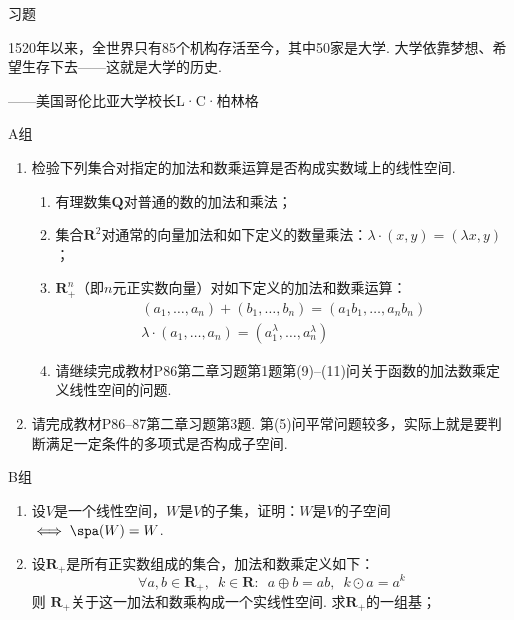\vspace{2ex}
\centerline{\heiti \Large 习题}

\vspace{2ex}
{\kaishu 1520年以来，全世界只有85个机构存活至今，其中50家是大学. 大学依靠梦想、希望生存下去——这就是大学的历史.}
\begin{flushright}
    \kaishu
    ——美国哥伦比亚大学校长L·C·柏林格
\end{flushright}

\centerline{\heiti A组}
\begin{enumerate}
    \item 检验下列集合对指定的加法和数乘运算是否构成实数域上的线性空间.
          \begin{enumerate}
              \item 有理数集$\mathbf{Q}$对普通的数的加法和乘法；

              \item 集合$\mathbf{R}^2$对通常的向量加法和如下定义的数量乘法：$\lambda\cdot(x,y)=(\lambda x,y)$；

              \item $\mathbf{R}_+^n$（即$n$元正实数向量）对如下定义的加法和数乘运算：
                    \begin{gather*}
                        (a_1,\ldots,a_n)+(b_1,\ldots,b_n)=(a_1b_1,\ldots,a_nb_n) \\
                        \lambda\cdot(a_1,\ldots,a_n)=(a_1^\lambda,\ldots,a_n^\lambda)
                    \end{gather*}

              \item 请继续完成教材P86第二章习题第1题第(9)--(11)问关于函数的加法数乘定义线性空间的问题.
          \end{enumerate}

    \item 请完成教材P86--87第二章习题第3题. 第(5)问平常问题较多，实际上就是要判断满足一定条件的多项式是否构成子空间.
\end{enumerate}

\centerline{\heiti B组}
\begin{enumerate}
    \item 设$V$是一个线性空间，$W$是$V$的子集，证明：$W$是$V$的子空间$\iff \spa(W)=W$.

    \item 设$\mathbf{R}_+$是所有正实数组成的集合，加法和数乘定义如下：
          \[ \forall a,b \in \mathbf{R}_+,\enspace k\in \mathbf{R}\colon\enspace a\oplus b = ab,\enspace k\odot a = a^k \]
          则 $\mathbf{R}_+$关于这一加法和数乘构成一个实线性空间. 求$\mathbf{R}_+$的一组基；
\end{enumerate}

